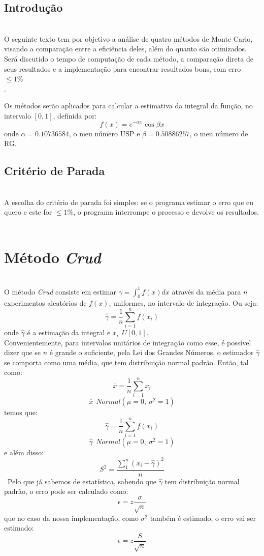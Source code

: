 \documentclass[pt12]{article}
\begin{document}
\tableofcontents

\newpage

\begin{center}\section{Introdução}\end{center}
\ \\

O seguinte texto tem por objetivo a análise de quatro métodos de Monte Carlo, visando a comparação entre a eficiência deles, além do quanto são otimizados. Será discutido o tempo de computação de cada método, a comparação direta de seus resultados e a implementação para encontrar resultados bons, com erro $\leq1\% $\\.

Os métodos serão aplicados para calcular a estimativa da integral da função, no intervalo $ [0,1]$, definida por:
$$f(x) = e^{-\alpha x}\cos{\beta x} $$
onde $\alpha = 0.10736584$, o meu número USP e $\beta = 0.50886257$, o meu número de RG.\\

\subsection{Critério de Parada}
\ \\
A escolha do critério de parada foi simples: se o programa estimar o erro que eu quero e este for $\leq 1\%$, o programa interrompe o processo e devolve os resultados.
\\ 
\ \\

\section{Método \textit{Crud}}
\ \\

O método \textit{Crud} consiste em estimar $\displaystyle{\gamma = \int_{0}^{1}f(x)dx}$ através da média para $n$ experimentos aleatórios de $f(x)$, uniformes, no intervalo de integração. Ou seja:
$$\displaystyle{\hat{\gamma} = \frac{1}{n}\sum_{i=1}^{n}f(x_i)}$$
onde $\hat{\gamma}$ é a estimação da integral e $x_i \ ~ U[0,1]$.\\
Convenientemente, para intervalos unitários de integração como esse, é possível dizer que se $n$ é grande o suficiente, pela Lei dos Grandes Números, o estimador $\hat{\gamma}$ se comporta como uma média, que tem distribuição normal padrão. Então, tal como:
$$\overline{x} = \frac{1}{n}\sum_{i=1}^{n}x_i$$
$$\overline{x} \ ~ Normal(\mu = 0,\ \sigma^2 = 1)$$
temos que:
$$\hat{\gamma} = \frac{1}{n}\sum_{i=1}^{n}f(x_i)$$
$$\hat{\gamma} \ ~ Normal(\mu = 0,\ \sigma^2 = 1)$$
e além disso:
$$S^2 = \frac{\sum_{1}^{n}(x_i - \hat{\gamma})^2}{n}$$
\ 
Pelo que já sabemos de estatística, sabendo que $\hat{\gamma}$ tem distribuição normal padrão, o erro pode ser calculado como:
$$\epsilon = z\frac{\sigma}{\sqrt{n}}$$
que no caso da nossa implementação, como $\sigma^2$ também é estimado, o erro vai ser estimado:
$$\epsilon = z\frac{S}{\sqrt{n}}$$
\end{document}
